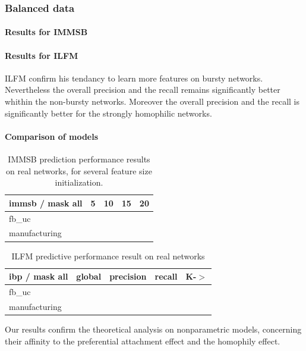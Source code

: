\subsubsection{Balanced data}
\paragraph{Results for IMMSB}

\paragraph{Results for ILFM}
ILFM confirm his tendancy to learn more features on bursty networks. Nevertheless the overall precision and the recall remains significantly better whithin the non-bursty networks. Moreover the overall precision and the recall is significantly better for the strongly homophilic networks.

\paragraph{Comparison of models}

\begin{table} \label{table:real1}
    \caption{IMMSB prediction performance results on real networks, for several feature size initialization.}
\begin{tabular}{lrrrr}
\hline                                                                             
 immsb / mask all   &        5 &       10 &       15 &       20 \\                 
\hline                                                                             
fb\_uc & & & & \\
manufacturing  & & & & \\
\hline                                                                             
\end{tabular}  
\end{table}

 

\begin{table} \label{table:real2}
    \caption{ILFM predictive performance result on real networks}
\begin{tabular}{lrrrr}
\hline
 ibp / mask all   &     global &   precision &      recall &   K-\ensuremath{>} \\
\hline
fb\_uc& & & & \\
manufacturing  & & & & \\
\hline
\end{tabular}  
\end{table}

Our results confirm the theoretical analysis on nonparametric models, concerning their affinity to the preferential attachment effect and the homophily effect.




